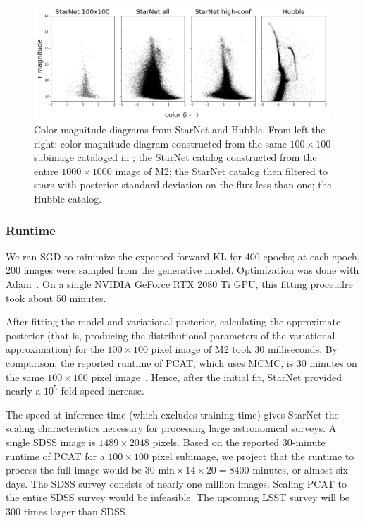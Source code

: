 \begin{figure}[tb]
    \centering
    \includegraphics[width=0.99\textwidth]{figures/m2_results/m2_cmd.png}
    \vspace{-0.5cm}
    \caption{Color-magnitude diagrams from StarNet and Hubble. From left the right: color-magnitude diagram constructed from the same $100\times100$ subimage cataloged in \cite{Feder_2019}; 
    the StarNet catalog constructed from the entire $1000 \times 1000$ image of M2; 
    the StarNet catalog then filtered to stars with posterior standard deviation on the flux less than one; the Hubble catalog. 
}
    \label{fig:m2_cmd}
\end{figure}

\subsubsection{Runtime}
\label{sec:runtime}
We ran SGD to minimize the expected forward KL
for 400 epochs; at each epoch, 200 images were sampled from the generative model.
Optimization was done with Adam~\citep{kingma2014adam}.
On a single NVIDIA GeForce RTX 2080 Ti GPU,
this fitting proceudre took about 50 minutes.

After fitting the model and variational posterior,
calculating the approximate posterior
(that is, producing the distributional parameters of the variational approximation) for the $100 \times 100$ pixel image of M2 took $30$ milliseconds.
By comparison, the reported runtime of PCAT, which uses MCMC, is 30 minutes on the same $100 \times 100$ pixel image~\citep{Feder_2019}.
Hence, after the initial fit, StarNet provided nearly a $10^5$-fold speed increase.

The speed at inference time (which excludes training time) gives StarNet the scaling characteristics necessary for processing large astronomical surveys.
A single SDSS image is $1489 \times 2048$ pixels.
Based on the reported 30-minute runtime of PCAT for a $100\times100$ pixel subimage, we project that
the runtime to process the full image would be $30\text{ min} \times 14 \times 20 = 8400$ minutes, or almost six days.
The SDSS survey consists of nearly one million images. Scaling PCAT to the entire SDSS survey would be infeasible.
The upcoming LSST survey will be 300 times larger than SDSS.

